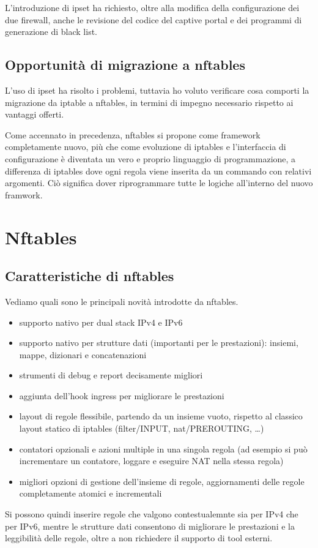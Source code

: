 L'introduzione di ipset ha richiesto, oltre alla modifica della configurazione
dei due firewall, anche le revisione del codice del captive portal e dei
programmi di generazione di black list.

\section{Opportunità di migrazione a nftables}

L'uso di ipset ha risolto i problemi, tuttavia ho voluto verificare cosa
comporti la migrazione da iptable a nftables, in termini di impegno necessario
rispetto ai vantaggi offerti.

Come accennato in precedenza, nftables si propone come framework completamente
nuovo, più che come evoluzione di iptables  e l'interfaccia di configurazione
è diventata un vero e proprio linguaggio di programmazione, a differenza di
iptables dove ogni regola viene inserita da un commando con relativi
argomenti.  Ci\`o significa dover riprogrammare tutte le logiche all'interno
del nuovo framwork.

\chapter{Nftables}

\section{Caratteristiche di nftables}
Vediamo quali sono le principali novit\`a introdotte da nftables.
\begin{itemize}
    \item supporto nativo per dual stack IPv4 e IPv6
    \item supporto nativo per strutture dati (importanti per le prestazioni):
    insiemi, mappe, dizionari e concatenazioni
    \item strumenti di debug e report decisamente migliori
    \item aggiunta dell'hook ingress per migliorare le prestazioni
    \item layout di regole flessibile, partendo da un insieme vuoto, rispetto
    al classico layout statico di iptables (filter/INPUT, nat/PREROUTING,
    \ldots)
    \item contatori opzionali e azioni multiple in una singola regola (ad
    esempio si pu\`o incrementare un contatore, loggare e eseguire NAT nella
    stessa regola)
    \item migliori opzioni di gestione dell'insieme di regole, aggiornamenti
    delle regole completamente atomici e incrementali
\end{itemize}
Si possono quindi inserire regole che valgono contestualemnte sia per IPv4 che
per IPv6,
mentre le strutture dati consentono di migliorare le prestazioni e la
leggibilit\`a delle regole, oltre a non richiedere il supporto di tool
esterni.

